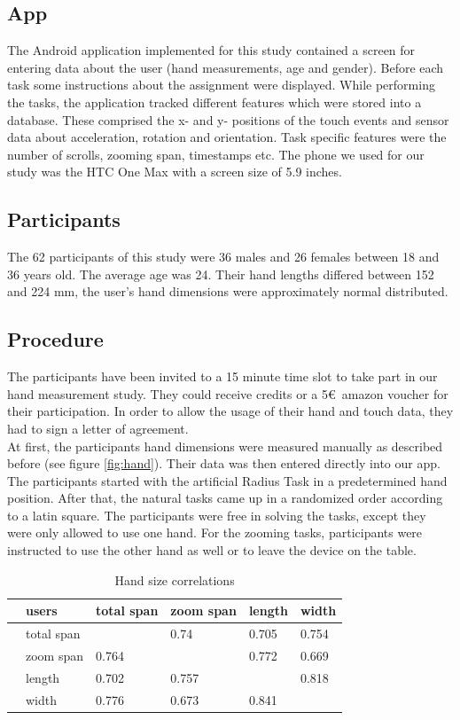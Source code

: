 \documentclass{sigchi}
\begin{document}
\subsection{App}
The Android application implemented for this study contained a screen for entering data about the user (hand measurements, age and gender). Before each task some instructions about the assignment were displayed. While performing the tasks, the application tracked different features which were stored into a database. These comprised the x- and y- positions of the touch events and sensor data about acceleration, rotation and orientation. Task specific features were the number of scrolls, zooming span, timestamps etc. The phone we used for our study was the HTC One Max with a screen size of 5.9 inches.

\subsection{Participants}
The 62 participants of this study were 36 males and 26 females between 18 and 36 years old. The average age was 24. Their hand lengths differed between 152 and 224 mm, the user's hand dimensions were approximately normal distributed.

\subsection{Procedure}
The participants have been invited to a 15 minute time slot to take part in our hand measurement study. They could receive credits or a 5\euro\ amazon voucher for their participation. In order to allow the usage of their hand and touch data, they had to sign a letter of agreement.\\
At first, the participants hand dimensions were measured manually as described before (see figure \ref{fig:hand}). Their data was then entered directly into our app. The participants started with the artificial Radius Task in a predetermined hand position. After that, the natural tasks came up in a randomized order according to a latin square. The participants were free in solving the tasks, except they were only allowed to use one hand. For the zooming tasks, participants were instructed to use the other hand as well or to leave the device on the table.

\begin{table}[ht]
\centering
\begin{tabular}{ll|llll}
 &users  &total span  &zoom span  &length  &width  \\ \hline
 &total span  &  &0.74  &0.705  &0.754 \\
 &zoom span  &0.764  &  &0.772  &0.669 \\
 &length  &0.702  &0.757  &  &0.818 \\
 &width  &0.776  &0.673  &0.841  &
\end{tabular}
\caption{Hand size correlations}
\label{handSizeCorrelations}
\end{table}
\end{document}
